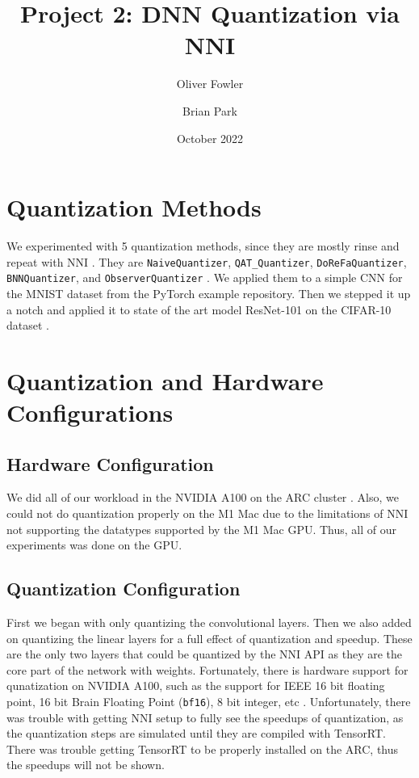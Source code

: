 \documentclass{article}
\title{Project 2: DNN Quantization via NNI}
\author{Oliver Fowler}
\author{Brian Park}
\affil{North Carolina State University, Computer Science 591/791-025}
\date{October 2022}
\begin{document}
\maketitle

\section{Quantization Methods}
We experimented with 5 quantization methods, since they are mostly rinse and repeat with NNI \cite{nni}. They are \verb|NaiveQuantizer|, \verb|QAT_Quantizer|, \verb|DoReFaQuantizer|, \verb|BNNQuantizer|, and \verb|ObserverQuantizer| \cite{dorefa,binarynn,qat}. We applied them to a simple CNN for the MNIST dataset from the PyTorch example repository. Then we stepped it up a notch and applied it to state of the art model ResNet-101 on the CIFAR-10 dataset \cite{resnet}.


\section{Quantization and Hardware Configurations}
\subsection{Hardware Configuration}
We did all of our workload in the NVIDIA A100 on the ARC cluster \cite{arc}. Also, we could not do quantization properly on the M1 Mac due to the limitations of NNI not supporting the datatypes supported by the M1 Mac GPU. Thus, all of our experiments was done on the GPU.

\subsection{Quantization Configuration}
First we began with only quantizing the convolutional layers. Then we also added on quantizing the linear layers for a full effect of quantization and speedup. These are the only two layers that could be quantized by the NNI API as they are the core part of the network with weights. Fortunately, there is hardware support for qunatization on NVIDIA A100, such as the support for IEEE 16 bit floating point, 16 bit Brain Floating Point (\verb|bf16|), 8 bit integer, etc \cite{a100}. Unfortunately, there was trouble with getting NNI setup to fully see the speedups of quantization, as the quantization steps are simulated until they are compiled with TensorRT. There was trouble getting TensorRT to be properly installed on the ARC, thus the speedups will not be shown.
\end{document}
